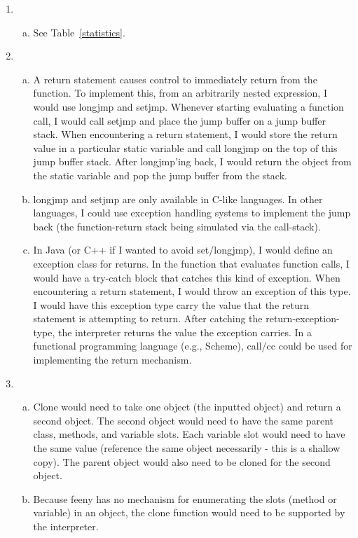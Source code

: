 \documentclass[notitlepage]{report}
\begin{document}
\begin{enumerate}
	\item
		\begin{enumerate}[(a)]
			\item See Table~\ref{statistics}.
		\end{enumerate}
	\item
		\begin{enumerate}[(a)]
			\item A return statement causes control to immediately return from the function.  To implement this, from an arbitrarily nested expression, I would use longjmp and setjmp.  Whenever starting evaluating a function call, I would call setjmp and place the jump buffer on a jump buffer stack.  When encountering a return statement, I would store the return value in a particular static variable and call longjmp on the top of this jump buffer stack. After longjmp'ing back, I would return the object from the static variable and pop the jump buffer from the stack.
			\item longjmp and setjmp are only available in C-like languages.  In other languages, I could use exception handling systems to implement the jump back (the function-return stack being simulated via the call-stack).
			\item In Java (or C++ if I wanted to avoid set/longjmp), I would define an exception class for returns.  In the function that evaluates function calls, I would have a try-catch block that catches this kind of exception.  When encountering a return statement, I would throw an exception of this type.  I would have this exception type carry the value that the return statement is attempting to return.  After catching the return-exception-type, the interpreter returns the value the exception carries. In a functional programming language (e.g., Scheme), call/cc could be used for implementing the return mechanism.
		\end{enumerate}
	\item
		\begin{enumerate}[(a)]
			\item Clone would need to take one object (the inputted object) and return a second object.  The second object would need to have the same parent class, methods, and variable slots.  Each variable slot would need to have the same value (reference the same object necessarily - this is a shallow copy).  The parent object would also need to be cloned for the second object.
			\item Because feeny has no mechanism for enumerating the slots (method or variable) in an object, the clone function would need to be supported by the interpreter.

\end{enumerate}
\end{enumerate}
\end{document}
